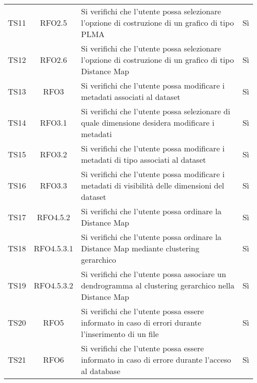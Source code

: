 \documentclass[../piano_di_qualifica.tex]{subfiles}
\begin{document}
\begin{center}
\begin{longtable}{|c|c|p{8cm}|c|}
		TS11              & RFO2.5                 & Si verifichi che l'utente possa selezionare l'opzione di costruzione di un grafico di tipo PLMA                           & Sì                         \\
		TS12              & RFO2.6                 & Si verifichi che l'utente possa selezionare l'opzione di costruzione di un grafico di tipo Distance Map                   & Sì                         \\
		TS13              & RFO3                   & Si verifichi che l'utente possa modificare i metadati associati al dataset                                                & Sì                         \\
		TS14              & RFO3.1                 & Si verifichi che l'utente possa selezionare di quale dimensione desidera modificare i metadati                            & Sì                         \\
		TS15              & RFO3.2                 & Si verifichi che l'utente possa modificare i metadati di tipo associati al dataset                                        & Sì                         \\
		TS16              & RFO3.3                 & Si verifichi che l'utente possa modificare i metadati di visibilità delle dimensioni del dataset                          & Sì                         \\
		TS17              & RFO4.5.2               & Si verifichi che l'utente possa ordinare la Distance Map                                                                  & Sì                         \\
		TS18              & RFO4.5.3.1             & Si verifichi che l'utente possa ordinare la Distance Map mediante clustering gerarchico                                   & Sì                         \\
		TS19              & RFO4.5.3.2             & Si verifichi che l'utente possa associare un dendrogramma al clustering gerarchico nella Distance Map                     & Sì                         \\
		TS20              & RFO5                   & Si verifichi che l'utente possa essere informato in caso di errori durante l'inserimento di un file                       & Sì                         \\
		TS21              & RFO6                   & Si verifichi che l'utente possa essere informato in caso di errore durante l'acceso al database                           & Sì                         \\

\end{longtable}
\end{center}
\end{document}
